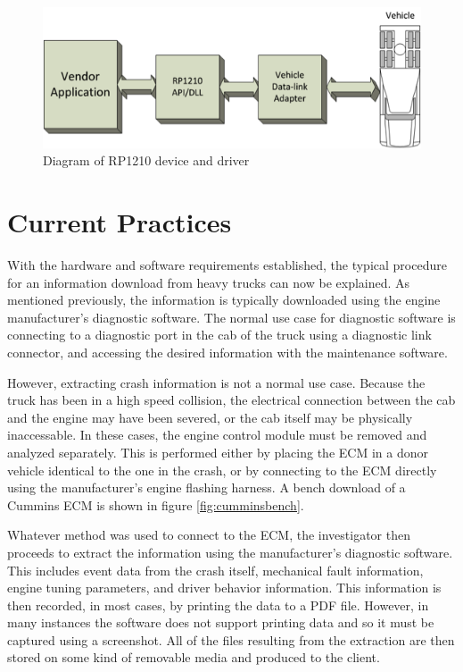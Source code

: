 \documentclass{report}
\begin{document}
\begin{figure}[h]
  \centering
  \includegraphics{RP1210}
  \caption{Diagram of RP1210 device and driver}
  \label{fig:rp1210}
\end{figure}

\section{Current Practices}

With the hardware and software requirements established, the typical procedure for an information download from heavy trucks can now be explained.
As mentioned previously, the information is typically downloaded using the engine manufacturer's diagnostic software. The normal use case
for diagnostic software is connecting to a diagnostic port in the cab of the truck using a diagnostic link connector, and accessing the desired
information with the maintenance software.

However, extracting crash information is not a normal use case. Because the truck has been in a high speed collision, the electrical connection
between the cab and the engine may have been severed, or the cab itself may be physically inaccessable. In these cases, the engine control module
must be removed and analyzed separately. This is performed either by placing the ECM in a donor vehicle identical to the one in the crash, or
by connecting to the ECM directly using the manufacturer's engine flashing harness. A bench download of a Cummins ECM is shown in figure \ref{fig:cumminsbench}.

Whatever method was used to connect to the ECM, the investigator then proceeds to extract the information using the manufacturer's diagnostic
software. This includes event data from the crash itself, mechanical fault information, engine tuning parameters, and driver behavior information.
This information is then recorded, in most cases, by printing the data to a PDF file. However, in many instances the software does not support
printing data and so it must be captured using a screenshot. All of the files resulting from the extraction are then stored on some kind of
removable media and produced to the client.
\end{document}
